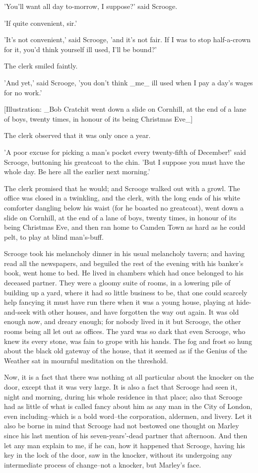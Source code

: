 'You'll want all day to-morrow, I suppose?' said Scrooge.

'If quite convenient, sir.'

'It's not convenient,' said Scrooge, 'and it's not fair. If I was to
stop half-a-crown for it, you'd think yourself ill used, I'll be bound?'

The clerk smiled faintly.

'And yet,' said Scrooge, 'you don't think _me_ ill used when I pay a
day's wages for no work.'

[Illustration: _Bob Cratchit went down a slide on Cornhill, at the end
of a lane of boys, twenty times, in honour of its being Christmas
Eve_]

The clerk observed that it was only once a year.

'A poor excuse for picking a man's pocket every twenty-fifth of
December!' said Scrooge, buttoning his greatcoat to the chin. 'But I
suppose you must have the whole day. Be here all the earlier next
morning.'

The clerk promised that he would; and Scrooge walked out with a growl.
The office was closed in a twinkling, and the clerk, with the long ends
of his white comforter dangling below his waist (for he boasted no
greatcoat), went down a slide on Cornhill, at the end of a lane of boys,
twenty times, in honour of its being Christmas Eve, and then ran home to
Camden Town as hard as he could pelt, to play at blind man's-buff.

Scrooge took his melancholy dinner in his usual melancholy tavern; and
having read all the newspapers, and beguiled the rest of the evening
with his banker's book, went home to bed. He lived in chambers which had
once belonged to his deceased partner. They were a gloomy suite of
rooms, in a lowering pile of building up a yard, where it had so little
business to be, that one could scarcely help fancying it must have run
there when it was a young house, playing at hide-and-seek with other
houses, and have forgotten the way out again. It was old enough now, and
dreary enough; for nobody lived in it but Scrooge, the other rooms
being all let out as offices. The yard was so dark that even Scrooge,
who knew its every stone, was fain to grope with his hands. The fog and
frost so hung about the black old gateway of the house, that it seemed
as if the Genius of the Weather sat in mournful meditation on the
threshold.

Now, it is a fact that there was nothing at all particular about the
knocker on the door, except that it was very large. It is also a fact
that Scrooge had seen it, night and morning, during his whole residence
in that place; also that Scrooge had as little of what is called fancy
about him as any man in the City of London, even including--which is a
bold word--the corporation, aldermen, and livery. Let it also be borne
in mind that Scrooge had not bestowed one thought on Marley since his
last mention of his seven-years'-dead partner that afternoon. And then
let any man explain to me, if he can, how it happened that Scrooge,
having his key in the lock of the door, saw in the knocker, without its
undergoing any intermediate process of change--not a knocker, but
Marley's face.

